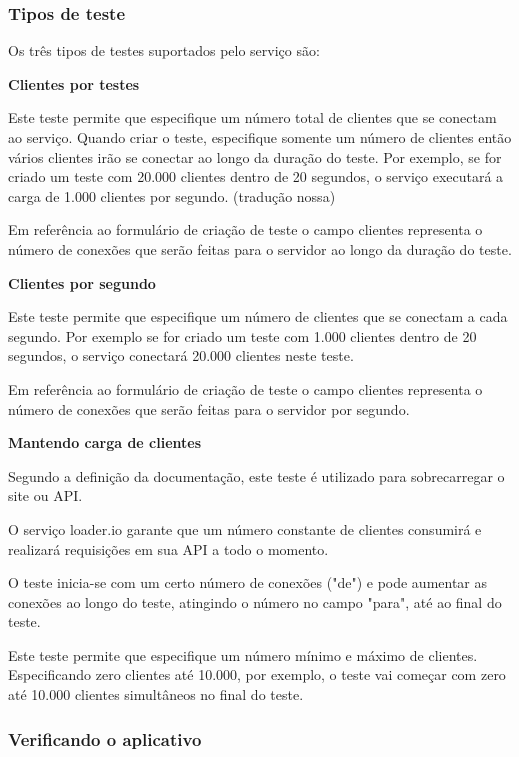 \subsubsection{Tipos de teste}
  
  Os três tipos de testes suportados pelo serviço são:
  
  \textbf{Clientes por testes}
  
  Este teste permite que especifique um número total de clientes que se conectam ao serviço. Quando criar o teste,
  especifique somente um número de clientes então vários clientes irão se conectar ao longo da duração do teste. 
  Por exemplo, se for criado um teste com 20.000 clientes dentro de 20 segundos, o serviço executará a carga de 
  1.000 clientes por segundo. (tradução nossa)
  
  Em referência ao formulário de criação de teste o campo clientes representa o número de conexões que serão
  feitas para o servidor ao longo da duração do teste.
  
  \textbf{Clientes por segundo}
  
  Este teste permite que especifique um número de clientes que se conectam a cada segundo. Por exemplo se for criado
  um teste com 1.000 clientes dentro de 20 segundos, o serviço conectará 20.000 clientes neste teste.
  
  Em referência ao formulário de criação de teste o campo clientes representa o número de conexões que serão
  feitas para o servidor por segundo.
  
  \textbf{Mantendo carga de clientes}
  
  Segundo a definição da documentação, este teste é utilizado para sobrecarregar o site ou \ac{API}.
  
  O serviço loader.io garante que um número constante de clientes consumirá e realizará requisições em 
  sua \ac{API} a todo o momento.
  
  O teste inicia-se com um certo número de conexões ("de")  e pode aumentar as conexões ao longo do teste, 
  atingindo o número no campo "para", até ao final do teste. 
  
  Este teste permite que especifique um número mínimo e máximo de clientes. Especificando zero clientes
  até 10.000, por exemplo, o teste vai começar com zero até 10.000 clientes simultâneos no final do teste.
  
\subsubsection{Verificando o aplicativo}

